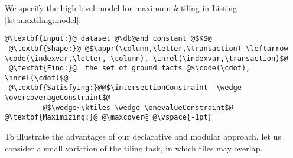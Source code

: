 We specify the high-level model for maximum $k$-tiling in Listing \ref{lst:maxtiling:model}.
\begin{lstlisting}[style=model,label=lst:maxtiling:model,caption=Maximum $k$-Tiling ReDF Model]
 @\textbf{Input:}@ dataset @\db@and constant @$K$@
 @\textbf{Shape:}@ @$\appr(\column,\letter,\transaction) \leftarrow \code(\indexvar,\letter, \column), \inrel(\indexvar,\transaction)$@
 @\textbf{Find:}@  the set of ground facts @$\code(\cdot), \inrel(\cdot)$@
 @\textbf{Satisfying:}@@$\intersectionConstraint  \wedge \overcoverageConstraint$@
         @$\wedge~\ktiles \wedge \onevalueConstraint$@
@\textbf{Maximizing:}@ @\maxcover@ @\vspace{-1pt}
 \end{lstlisting}
To illustrate the advantages of our declarative and modular approach, let us consider a small variation of the tiling task, in which tiles may overlap. 
